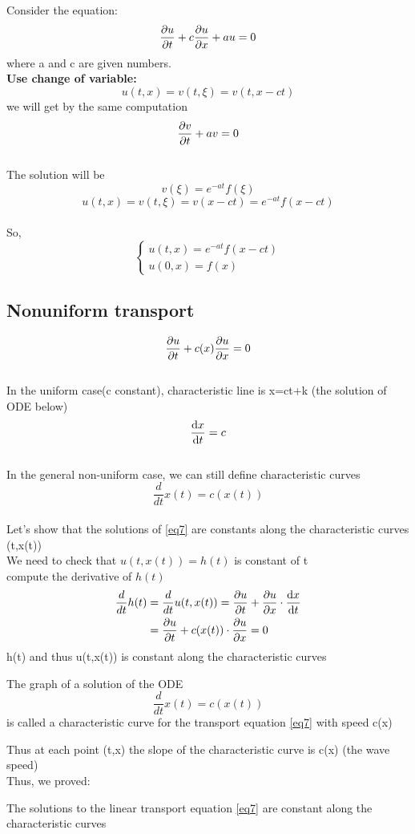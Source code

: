 Consider the equation:
\begin{equation}
    \label{eq6} \pdv{u}{t}+c\pdv{u}{x}+au=0
\end{equation}
where a and c are given numbers.
\\\textbf{Use change of variable:}
$$
    u(t,x)=v(t,\xi)=v(t,x-ct)
$$ we will get by the same computation
$$
    \pdv{v}{t}+av=0
$$ 
\\The solution will be$$
    v(\xi)=e^{-at}f(\xi)
$$ 
$$
    u(t,x)=v(t,\xi)=v(x-ct)=e^{-at}f(x-ct)
$$ 
\\So,
$$
    \begin{cases}u(t,x)=e^{-at}f(x-ct)\\u(0,x)=f(x)\end{cases}
$$ 
\subsection{Nonuniform transport}
\begin{equation}
    \label{eq7} \pdv{u}{t}+c(x)\pdv{u}{x}=0
\end{equation}
\\In the uniform case(c constant), characteristic line is x=ct+k  (the solution of ODE below)
$$
    \dv{x}{t}=c
$$ 
\\In the general non-uniform case, we can still define characteristic curves
$$
    \frac{d}{dt}x(t)=c(x(t))
$$ 
\\Let's show that the solutions of \eqref{eq7} are constants along the characteristic curves (t,x(t))
\\We need to check that $ u(t,x(t))=h(t) $ is constant of t 
\\compute the derivative of $ h(t)$ 
\begin{align*}
    \frac{d}{dt}h(t) &= \frac{d}{dt}u(t,x(t)) = \pdv{u}{t}(t,x(t))+\pdv{u}{x}(t,x(t))\cdot\dv{x}{t} \\
    &= \pdv{u}{t}(t,x(t))+c(x(t)) \cdot \pdv{u}{x}(t,x(t)) = 0
\end{align*}
h(t) and thus u(t,x(t)) is constant along the characteristic curves
\begin{definition}{}{}
The graph of a solution of the ODE $$\frac{d}{dt}x(t)=c(x(t))$$ is called a characteristic curve for the transport equation \eqref{eq7} with speed c(x)
\end{definition}
Thus at each point (t,x) the slope of the characteristic curve is c(x) (the wave speed)
\\Thus, we proved:
\begin{proposition}{}{}
The solutions to the linear transport equation \eqref{eq7} are constant along the characteristic curves
\end{proposition}
